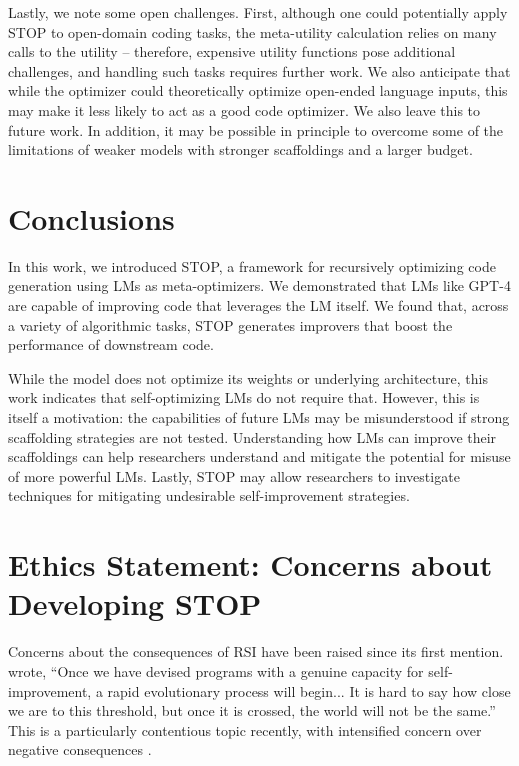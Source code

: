 \documentclass{article}
\begin{document}
Lastly, we note some open challenges. First, although one could potentially apply STOP to open-domain coding tasks, the meta-utility calculation relies on many calls to the utility -- therefore, expensive utility functions pose additional challenges, and handling such tasks requires further work. We also anticipate that while the optimizer could theoretically optimize open-ended language inputs, this may make it less likely to act as a good code optimizer. We also leave this to future work. In addition, it may be possible in principle to overcome some of the limitations of weaker models with stronger scaffoldings and a larger budget.




\section{Conclusions}
\vspace{-2px}
In this work, we introduced STOP, a framework for recursively optimizing code generation using LMs as meta-optimizers. We demonstrated that LMs like GPT-4 are capable of improving code that leverages the LM itself. We found that, across a variety of algorithmic tasks, STOP generates improvers that boost the performance of downstream code. 

While the model does not optimize its weights or underlying architecture, this work indicates that self-optimizing LMs do not require that.
However, this is itself a motivation: the capabilities of future LMs may be misunderstood if strong scaffolding strategies are not tested.
Understanding how LMs can improve their scaffoldings can help researchers understand and mitigate the potential for misuse of more powerful LMs.
Lastly, STOP may allow researchers to investigate techniques for mitigating undesirable self-improvement strategies.

\section*{Ethics Statement: Concerns about Developing STOP}\label{sec:concerns}
\vspace{-3px}
Concerns about the consequences of RSI have been raised since its first mention. \citet{minsky_marvin_artificial_1966} wrote, ``Once we have devised programs with a genuine capacity for self-improvement, a rapid evolutionary process will begin...
It is hard to say how close we are to this threshold, but once it is crossed, the world will not be the same.'' This is a particularly contentious topic recently, with intensified concern over negative consequences \citep{ambartsoumean2023ai, gabriel_challenge_2021}.
\end{document}
